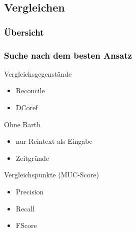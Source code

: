\documentclass[xcolor=dvipsnames]{beamer}
\begin{document}
\subsection{Vergleichen}


\begin{frame}[plain]\frametitle{\textcolor{black}{Übersicht}}


\end{frame}

\addtocounter{framenumber}{-1}


\begin{frame}\frametitle{\textcolor{black}{Suche nach dem besten Ansatz}}

\begin{block}{Vergleichsgegenstände}
\begin{itemize}
\item Reconcile
\item DCoref
\end{itemize}
\end{block}

\begin{block}{Ohne Barth}
\begin{itemize}
\item nur Reintext als Eingabe
\item Zeitgründe
\end{itemize}
\end{block}

\begin{block}{Vergleichspunkte (MUC-Score)}
  \begin{itemize}
    \item Precision
    \item Recall
    \item FScore
  \end{itemize}
\end{block}

\end{frame}

\end{document}
